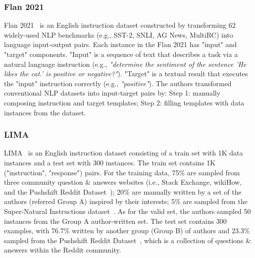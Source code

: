\documentclass[11pt]{article}
\begin{document}
\subsubsection{Flan 2021}
Flan 2021~\citep{longpre2023flan} is an English instruction dataset constructed by transforming 62 widely-used NLP benchmarks (e.g., SST-2, SNLI, AG News, MultiRC) into language input-output pairs. Each instance in the Flan 2021 has "input" and "target" components. "Input" is a sequence of text that describes a task via a natural language instruction (e.g., \textit{"determine the sentiment of the sentence 'He likes the cat.' is positive or negative?"}). "Target" is a textual result that executes the "input" instruction correctly (e.g., \textit{"positive"}). 
The authors transformed conventional NLP datasets into input-target pairs by: 
Step 1: manually composing instruction and target templates;
Step 2: filling templates with data instances from the dataset. 

\subsubsection{LIMA}
LIMA~\citep{Zhou2023LIMALI} is an English instruction dataset consisting of a train set with 1K data instances and a test set with 300 instances. 
The train set contains 1K ("instruction", "response") pairs. 
For the training data, 
75\%  are sampled from three community question \& answers websites (i.e., Stack Exchange, wikiHow, and the Pushshift Reddit Dataset~\citep{Baumgartner2020ThePR}); 20\%  are manually written by a set of the authors (referred Group A) inspired by their interests; 5\% are sampled from the Super-Natural Instructions dataset~\citep{Wang2022SuperNaturalInstructionsGV}. As for the valid set, the authors sampled 50 instances from the Group A author-written set.  
The test set contains 300 examples, with 76.7\% written by another group (Group B) of authors and 23.3\% sampled from the Pushshift Reddit Dataset~\citep{Baumgartner2020ThePR}, which is a collection of questions \& answers within the Reddit community. 
\end{document}
